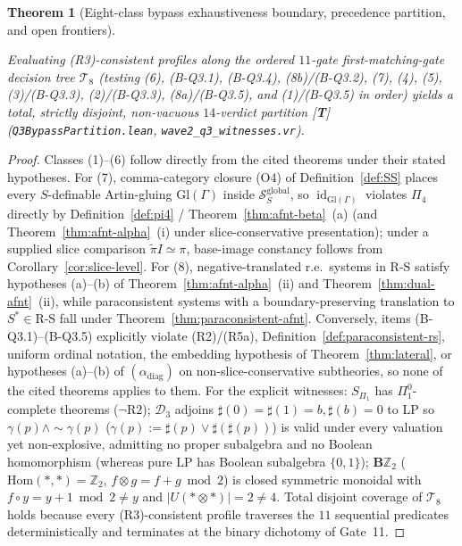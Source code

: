 \documentclass[11pt]{article}
\theoremstyle{plain}
\newtheorem{theorem}{Theorem}[section]
\theoremstyle{definition}
\newcommand{\RS}{\mathrm{R\text{-}S}}
\newcommand{\cS}{\mathcal{S}}
\newcommand{\Hom}{\mathrm{Hom}}
\newcommand{\tpi}{\widetilde{\pi}}
\DeclareMathOperator{\id}{id}
\begin{document}
\begin{theorem}[Eight-class bypass exhaustiveness boundary, precedence partition, and open frontiers]
\begin{enumerate}[nosep,label=(\roman*)]
  Evaluating (R3)-consistent profiles along the ordered $11$-gate first-matching-gate decision tree $\mathcal{T}_8$ (testing (6), (B-Q3.1), (B-Q3.4), (8b)/(B-Q3.2), (7), (4), (5), (3)/(B-Q3.3), (2)/(B-Q3.3), (8a)/(B-Q3.5), and (1)/(B-Q3.5) in order) yields a total, strictly disjoint, non-vacuous $14$-verdict partition \textup{[\textbf{T}]} (\texttt{Q3BypassPartition.lean}, \texttt{wave2\_q3\_witnesses.vr}).
\end{enumerate}
\end{theorem}
\begin{proof}
Classes (1)--(6) follow directly from the cited theorems under their stated hypotheses. For (7), comma-category closure (O4) of Definition~\ref{def:SS} places every $S$-definable Artin-gluing $\mathrm{Gl}(\Gamma)$ inside $\cS_S^{\mathrm{global}}$, so $\id_{\mathrm{Gl}(\Gamma)}$ violates $\Pi_4$ directly by Definition~\ref{def:pi4} / Theorem~\ref{thm:afnt-beta}~(a) (and Theorem~\ref{thm:afnt-alpha}~(i) under slice-conservative presentation); under a supplied slice comparison $\tpi I \simeq \pi$, base-image constancy follows from Corollary~\ref{cor:slice-level}. For (8), negative-translated r.e.\ systems in $\RS$ satisfy hypotheses (a)--(b) of Theorem~\ref{thm:afnt-alpha}~(ii) and Theorem~\ref{thm:dual-afnt}~(ii), while paraconsistent systems with a boundary-preserving translation to $S^* \in \RS$ fall under Theorem~\ref{thm:paraconsistent-afnt}. Conversely, items (B-Q3.1)--(B-Q3.5) explicitly violate (R2)/(R5a), Definition~\ref{def:paraconsistent-rs}, uniform ordinal notation, the embedding hypothesis of Theorem~\ref{thm:lateral}, or hypotheses (a)--(b) of $(\alpha_{\mathrm{diag}})$ on non-slice-conservative subtheories, so none of the cited theorems applies to them. For the explicit witnesses: $S_{\Pi_1}$ has $\Pi_1^0$-complete theorems ($\neg\mathrm{R2}$); $\mathcal{D}_3$ adjoins $\sharp(0)=\sharp(1)=b, \sharp(b)=0$ to $\mathrm{LP}$ so $\gamma(p) \wedge \sim\gamma(p)$ ($\gamma(p):=\sharp(p)\vee\sharp(\sharp(p))$) is valid under every valuation yet non-explosive, admitting no proper subalgebra and no Boolean homomorphism (whereas pure $\mathrm{LP}$ has Boolean subalgebra $\{0,1\}$); $\mathbf{B}\mathbb{Z}_2$ ($\Hom(*,*)=\mathbb{Z}_2$, $f\otimes g = f+g\bmod 2$) is closed symmetric monoidal with $f \circ y = y+1\bmod 2 \neq y$ and $|U(*\otimes *)|=2\neq 4$. Total disjoint coverage of $\mathcal{T}_8$ holds because every (R3)-consistent profile traverses the $11$ sequential predicates deterministically and terminates at the binary dichotomy of Gate~11.
\end{proof}
\end{document}
